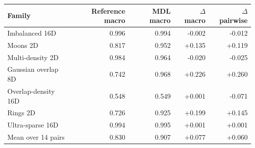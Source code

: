 \begin{tabular}{lrrrr}
\toprule
Family & Reference macro & MDL macro & $\Delta$ macro & $\Delta$ pairwise \\
\midrule
Imbalanced 16D & 0.996 & 0.994 & -0.002 & -0.012 \\
Moons 2D & 0.817 & 0.952 & +0.135 & +0.119 \\
Multi-density 2D & 0.984 & 0.964 & -0.020 & -0.025 \\
Gaussian overlap 8D & 0.742 & 0.968 & +0.226 & +0.260 \\
Overlap-density 16D & 0.548 & 0.549 & +0.001 & -0.071 \\
Rings 2D & 0.726 & 0.925 & +0.199 & +0.145 \\
Ultra-sparse 16D & 0.994 & 0.995 & +0.001 & +0.001 \\
\midrule
Mean over 14 pairs & 0.830 & 0.907 & +0.077 & +0.060 \\
\bottomrule
\end{tabular}
